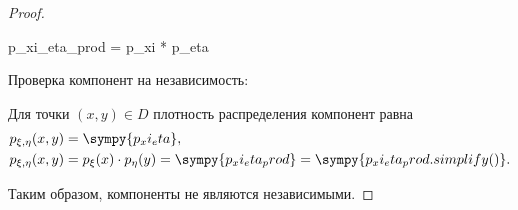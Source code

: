 \begin{proof}
  \begin{sympycode}
p_xi_eta_prod = p_xi * p_eta
\end{sympycode}
  Проверка компонент на независимость:

  Для точки $(x, y) \in D$ плотность распределения компонент равна
  \[
    \begin{aligned}
      p_{\xi, \eta} (x, y) & = \sympy{p_xi_eta},                                                                          \\
      p_{\xi, \eta} (x, y) & = p_{\xi} (x) \cdot p_{\eta} (y) = \sympy{p_xi_eta_prod} = \sympy{p_xi_eta_prod.simplify()}.
    \end{aligned}
  \]

  Таким образом, компоненты не являются независимыми.

\end{proof}

